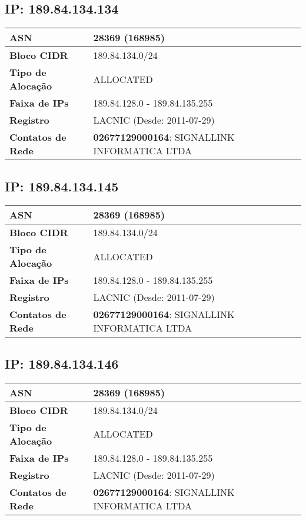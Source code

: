     \subsection{IP: 189.84.134.134}
    \begin{tabular}{|l|l|}
    \hline
    \textbf{ASN} & 28369 (168985) \\ \hline
    \textbf{Bloco CIDR} & 189.84.134.0/24 \\ \hline
    \textbf{Tipo de Alocação} & ALLOCATED \\ \hline
    \textbf{Faixa de IPs} & 189.84.128.0 - 189.84.135.255 \\ \hline
    \textbf{Registro} & LACNIC (Desde: 2011-07-29) \\ \hline
        
\textbf{Contatos de Rede} & \textbf{02677129000164}: SIGNALLINK INFORMATICA LTDA 
\\ \hline
\end{tabular}


    \subsection{IP: 189.84.134.145}
    \begin{tabular}{|l|l|}
    \hline
    \textbf{ASN} & 28369 (168985) \\ \hline
    \textbf{Bloco CIDR} & 189.84.134.0/24 \\ \hline
    \textbf{Tipo de Alocação} & ALLOCATED \\ \hline
    \textbf{Faixa de IPs} & 189.84.128.0 - 189.84.135.255 \\ \hline
    \textbf{Registro} & LACNIC (Desde: 2011-07-29) \\ \hline
        
\textbf{Contatos de Rede} & \textbf{02677129000164}: SIGNALLINK INFORMATICA LTDA 
\\ \hline
\end{tabular}


    \subsection{IP: 189.84.134.146}
    \begin{tabular}{|l|l|}
    \hline
    \textbf{ASN} & 28369 (168985) \\ \hline
    \textbf{Bloco CIDR} & 189.84.134.0/24 \\ \hline
    \textbf{Tipo de Alocação} & ALLOCATED \\ \hline
    \textbf{Faixa de IPs} & 189.84.128.0 - 189.84.135.255 \\ \hline
    \textbf{Registro} & LACNIC (Desde: 2011-07-29) \\ \hline
        
\textbf{Contatos de Rede} & \textbf{02677129000164}: SIGNALLINK INFORMATICA LTDA 
\\ \hline
\end{tabular}


